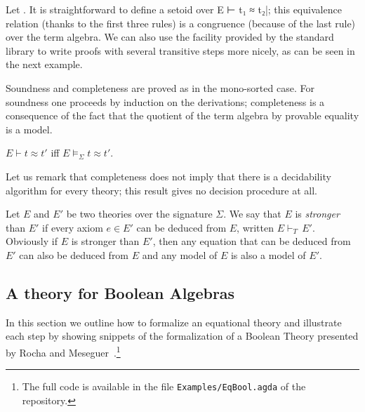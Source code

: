 Let . It is straightforward to
define a setoid over E ⊢ t₁ ≈
t₂|; this equivalence relation (thanks to the first three rules) is a
congruence (because of the last rule) over the term algebra. We can
also use the facility provided by the standard library to write
proofs with several transitive steps more nicely, as can be seen
in the next example.

Soundness and completeness are proved as in the
mono-sorted case. For soundness one proceeds by induction on the
derivations; completeness is a consequence of the fact that the quotient of the
term algebra by provable equality is a model.
\begin{theorem}
  $E \vdash t ≈ t'$ iff $E \models_{\Sigma} t ≈ t'$.
\end{theorem}
\noindent Let us remark that completeness does not imply that there is a
decidability algorithm for every theory; \ie this result gives no decision
procedure at all.

Let $E$ and $E'$ be two theories over the signature $\Sigma$. We say
that $E$ is \emph{stronger} than $E'$ if every axiom $e \in E'$ can be
deduced from $E$, written $E \vdash_{T}\, E'$.  Obviously if $E$
is stronger than $E'$, then any equation that can be deduced from $E'$
can also be deduced from $E$ and any model of $E$ is also a model of
$E'$. 

\subsection{A theory for Boolean Algebras } In this section we outline
how to formalize an equational theory and illustrate each step by
showing snippets of the formalization of a Boolean Theory presented by
Rocha and Meseguer~\cite{DBLP:conf/RelMiCS/RochaM08}.\footnote{The
  full code is available in the file \nolinkurl{Examples/EqBool.agda}
  of the repository.}



